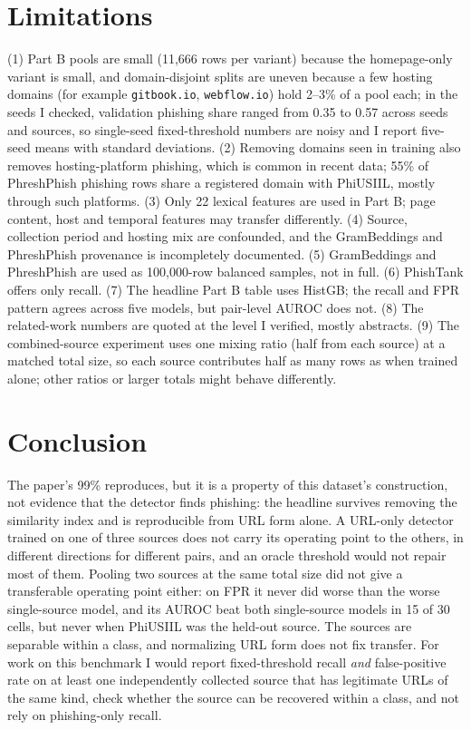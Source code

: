 \documentclass[10pt]{article}
\begin{document}
\section{Limitations}
(1) Part B pools are small (11,666 rows per variant) because the homepage-only variant is small, and domain-disjoint splits are uneven because a few hosting domains (for example \texttt{gitbook.io}, \texttt{webflow.io}) hold 2--3\% of a pool each; in the seeds I checked, validation phishing share ranged from 0.35 to 0.57 across seeds and sources, so single-seed fixed-threshold numbers are noisy and I report five-seed means with standard deviations. (2) Removing domains seen in training also removes hosting-platform phishing, which is common in recent data; 55\% of PhreshPhish phishing rows share a registered domain with PhiUSIIL, mostly through such platforms. (3) Only 22 lexical features are used in Part B; page content, host and temporal features may transfer differently. (4) Source, collection period and hosting mix are confounded, and the GramBeddings and PhreshPhish provenance is incompletely documented. (5) GramBeddings and PhreshPhish are used as 100,000-row balanced samples, not in full. (6) PhishTank offers only recall. (7) The headline Part B table uses HistGB; the recall and FPR pattern agrees across five models, but pair-level AUROC does not. (8) The related-work numbers are quoted at the level I verified, mostly abstracts. (9) The combined-source experiment uses one mixing ratio (half from each source) at a matched total size, so each source contributes half as many rows as when trained alone; other ratios or larger totals might behave differently.

\section{Conclusion}
The paper's 99\% reproduces, but it is a property of this dataset's construction, not evidence that the detector finds phishing: the headline survives removing the similarity index and is reproducible from URL form alone. A URL-only detector trained on one of three sources does not carry its operating point to the others, in different directions for different pairs, and an oracle threshold would not repair most of them. Pooling two sources at the same total size did not give a transferable operating point either: on FPR it never did worse than the worse single-source model, and its AUROC beat both single-source models in 15 of 30 cells, but never when PhiUSIIL was the held-out source. The sources are separable within a class, and normalizing URL form does not fix transfer. For work on this benchmark I would report fixed-threshold recall \emph{and} false-positive rate on at least one independently collected source that has legitimate URLs of the same kind, check whether the source can be recovered within a class, and not rely on phishing-only recall.
\end{document}
